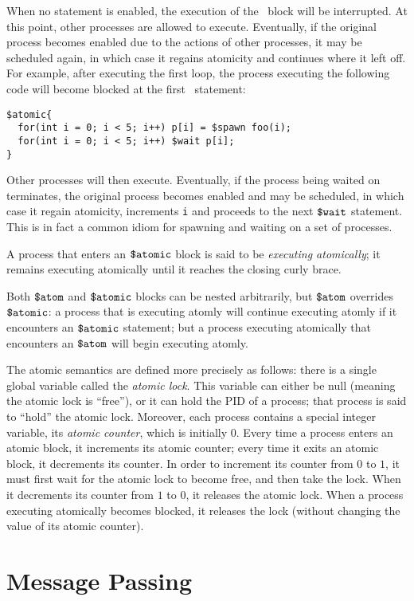 When no statement is enabled, the execution of the \catomic\ block
will be interrupted.  At this point, other processes are allowed to
execute.  Eventually, if the original process becomes enabled due to
the actions of other processes, it may be scheduled again, in which
case it regains atomicity and continues where it left off.  For
example, after executing the first loop, the process executing the
following code will become blocked at the first \cwait\ statement:
 \begin{verbatim}  
$atomic{
  for(int i = 0; i < 5; i++) p[i] = $spawn foo(i);
  for(int i = 0; i < 5; i++) $wait p[i];
}
\end{verbatim}
Other processes will then execute. Eventually, if the process being
waited on terminates, the original process becomes enabled and may be
scheduled, in which case it regain atomicity, increments \texttt{i}
and proceeds to the next $\mbox{\texttt{\${}wait}}$ statement.  This is in fact a common
idiom for spawning and waiting on a set of processes.

A process that enters an $\mbox{\texttt{\${}atomic}}$ block is said to be
\emph{executing atomically}; it remains executing atomically until it
reaches the closing curly brace.

Both $\mbox{\texttt{\${}atom}}$ and $\mbox{\texttt{\${}atomic}}$ blocks can be nested arbitrarily, but
$\mbox{\texttt{\${}atom}}$ overrides $\mbox{\texttt{\${}atomic}}$: a process that is executing atomly will
continue executing atomly if it encounters an $\mbox{\texttt{\${}atomic}}$ statement;
but a process executing atomically that encounters an $\mbox{\texttt{\${}atom}}$ will
begin executing atomly.

The atomic semantics are defined more precisely as follows: there is a
single global variable called the \emph{atomic lock}. This variable
can either be null (meaning the atomic lock is ``free''), or it can
hold the PID of a process; that process is said to ``hold'' the atomic
lock.  Moreover, each process contains a special integer variable, its
\emph{atomic counter}, which is initially 0.  Every time a process
enters an atomic block, it increments its atomic counter; every time
it exits an atomic block, it decrements its counter.  In order to
increment its counter from $0$ to $1$, it must first wait for the
atomic lock to become free, and then take the lock.  When it
decrements its counter from $1$ to $0$, it releases the atomic lock.
When a process executing atomically becomes blocked, it releases the
lock (without changing the value of its atomic counter).


\section{Message Passing}


